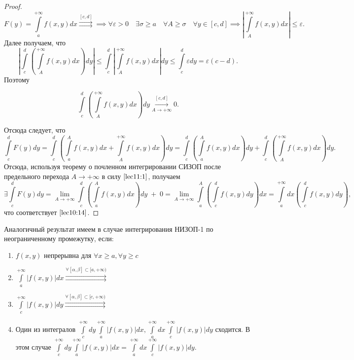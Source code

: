 \documentclass[../../main.tex]{subfiles}
\begin{document}
\begin{proof}
	$$F(y) = \int\limits_a^{+\infty} f(x, y)dx \overset{[c, d]}\rightrightarrows \implies
	\forall \varepsilon > 0 \quad \exists \sigma \geq a \quad \forall A \geq \sigma \quad \forall y \in [c, d] \implies \left|\int\limits_A^{+\infty}f(x, y) dx \right| \leq \varepsilon.$$ 
	Далее получаем, что 
	$$ \left| \int\limits_c^d\left(\int\limits_A^{+\infty}f(x, y)dx\right) dy\right| 
	\leq \int\limits_c^d\left|\int\limits_A^{+\infty}f(x, y)dx\right| dy
	\leq \int\limits_c^d \varepsilon dy = \varepsilon(c - d).$$
	Поэтому 
	
	\begin{equation} \label{lec11:1}
		\int\limits_c^d \left( \int\limits_A^{+\infty} f(x, y) dx \right) dy \overset{[c, d]}{\underset{A \rightarrow +\infty}\longrightarrow} 0.
	\end{equation}
	
	Отсюда следует, что
	$$
	\int\limits_c^d F(y)dy = \int\limits_c^d \left( \int\limits_a^A f(x, y)dx + \int\limits_A^{+\infty} f(x, y) dx \right) dy = \int\limits_c^d \left( \int\limits_a^A f(x, y) dx \right) dy + \int\limits_c^d \left( \int\limits_A^{+\infty} f(x, y) dx \right) dy.
	$$
	Отсюда, используя теорему о почленном интегрировании СИЗОП после предельного перехода $A \longrightarrow +\infty$ в силу $\eqref{lec11:1}$, получаем 
	$$
	\exists \int\limits_c^d F(y) dy = \lim_{A \rightarrow +\infty} \int\limits_c^d \left( \int\limits_a^A f(x, y) dx \right) dy \; + \; 0 
	= \lim_{A \rightarrow +\infty} \int\limits_a^A \left( \int\limits_c^d f(x, y) dy \right) dx 
	= \int\limits_a^{+\infty} dx \left( \int\limits_c^d f(x, y) dy \right),
	$$ что соответствует $\eqref{lec10:14}$.
\end{proof}

\begin{rem}
	Аналогичный результат имеем в случае интегрирования НИЗОП-1 по неограниченному промежутку, если:
	\begin{enumerate}
		\item $\displaystyle f(x, y)$ непрерывна для $\forall x \geq a, \forall y \geq c$
		\item $\displaystyle \int\limits_a^{+\infty} \left| f(x, y) \right| dx \overset{\forall [\alpha, \beta] \subset [a, +\infty) }\rightrightarrows$
		\item $\displaystyle \int\limits_c^{+\infty} \left| f(x, y) \right| dy \overset{\forall [\alpha, \beta] \subset [c, +\infty) }\rightrightarrows$
		\item Один из интегралов $\displaystyle \int\limits_c^{+\infty} dy \int\limits_a^{+\infty} \left|f(x, y)\right| dx,
		\int\limits_a^{+\infty} dx \int\limits_c^{+\infty} \left|f(x, y)\right| dy$
		сходится. В этом случае
		$\displaystyle \int\limits_c^{+\infty} dy \int\limits_a^{+\infty} \left|f(x, y)\right| dx = \int\limits_a^{+\infty} dx \int\limits_c^{+\infty} \left|f(x, y)\right| dy$.
	\end{enumerate}
\end{rem}
\end{document}
